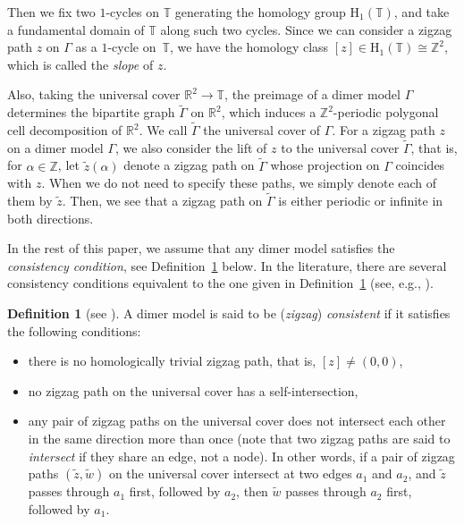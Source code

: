 \documentclass[pdftex]{sigma}
\numberwithin{equation}{section}
\theoremstyle{definition}
\newtheorem{Definition}[Theorem]{Definition}
\newcommand{\ZZ}{\mathbb{Z}}
\newcommand{\RR}{\mathbb{R}}
\newcommand{\TT}{\mathbb{T}}
\newcommand{\rmH}{\mathrm{H}}
\begin{document}
Then we fix two $1$-cycles on $\TT$ generating the homology group $\rmH_1(\TT)$, and take a fundamental domain of $\TT$ along such two cycles.
Since we can consider a zigzag path $z$ on $\Gamma$ as a $1$-cycle on~$\TT$, we have the homology class $[z]\in\rmH_1(\TT)\cong\ZZ^2$,
which is called the \emph{slope} of $z$.


Also, taking the universal cover $\RR^2\rightarrow\TT$, the preimage of a dimer model $\Gamma$ determines the bipartite graph $\widetilde{\Gamma}$ on $\RR^2$, which induces a $\ZZ^2$-periodic polygonal cell decomposition of $\RR^2$.
We call $\widetilde{\Gamma}$ the universal cover of $\Gamma$.
For a zigzag path $z$ on a dimer model $\Gamma$, we also consider the lift of $z$ to the universal cover $\widetilde{\Gamma}$,
that is, for $\alpha\in\ZZ$, let $\widetilde{z}{(\alpha)}$ denote a zigzag path on $\widetilde{\Gamma}$ whose projection on $\Gamma$ coincides with $z$.
When we do not need to specify these paths, we simply denote each of them by $\widetilde{z}$.
Then, we see that a zigzag path on $\widetilde{\Gamma}$ is either periodic or infinite in both directions.

In the rest of this paper, we assume that any dimer model satisfies the \emph{consistency condition}, see Definition~\ref{def_consistent} below.
In the literature, there are several consistency conditions equivalent to the one given in Definition~\ref{def_consistent} (see, e.g., \cite{Boc_consistent,IU_consistent}).

\begin{Definition}[{see \cite[Definition~3.5]{IU_consistent}}]\label{def_consistent}
A dimer model is said to be (\emph{zigzag}) \emph{consistent} if it satisfies the following conditions:
\begin{itemize}\itemsep=0pt
\item [(1)] there is no homologically trivial zigzag path, that is, $[z]\neq (0,0)$,
\item [(2)] no zigzag path on the universal cover has a self-intersection,
\item [(3)] any pair of zigzag paths on the universal cover does not intersect each other in the same direction more than once (note that two zigzag paths are said to \emph{intersect} if they share an edge, not a node).
In other words, if a pair of zigzag paths $(\widetilde{z},\widetilde{w})$ on the universal cover intersect at two edges $a_1$ and $a_2$,
and $\widetilde{z}$ passes through $a_1$ first, followed by $a_2$,
then $\widetilde{w}$ passes through $a_2$ first, followed by $a_1$.
\end{itemize}
\end{Definition}
\end{document}
